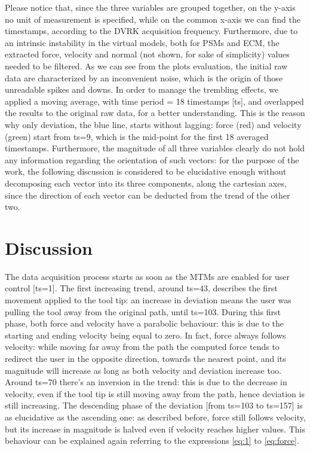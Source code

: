 \documentclass[conference]{IEEEtran}
\begin{document}
Please notice that, since the three variables are grouped together, on the y-axis no unit of measurement is specified, while on the common x-axis we can find the timestamps, according to the DVRK acquisition frequency. Furthermore, due to an intrinsic instability in the virtual models, both for PSMs and ECM, the extracted force, velocity and normal (not shown, for sake of simplicity) values needed to be filtered. As we can see from the plots evaluation, the initial raw data are characterized by an inconvenient noise, which is the origin of those unreadable spikes and downs. In order to manage the trembling effects, we applied a moving average, with time period = 18 timestamps [ts], and overlapped the results to the original raw data, for a better understanding. This is the reason why only deviation, the blue line, starts without lagging: force (red) and velocity (green) start from ts=9, which is the mid-point for the first 18 averaged timestamps. Furthermore, the magnitude of all three variables clearly do not hold any information regarding the orientation of such vectors: for the purpose of the work, the following discussion is considered to be elucidative enough without decomposing each vector into its three components, along the cartesian axes, since the direction of each vector can be deducted from the trend of the other two.

\section{Discussion}

The data acquisition process starts as soon as the MTMs are enabled for user control [ts=1]. The first increasing trend, around ts=43, describes the first movement applied to the tool tip: an increase in deviation means the user was pulling the tool away from the original path, until ts=103. During this first phase, both force and velocity have a parabolic behaviour: this is due to the starting and ending velocity being equal to zero. In fact, force always follows velocity: while moving far away from the path the computed force tends to redirect the user in the opposite direction, towards the nearest point, and its magnitude will increase as long as both velocity and deviation increase too. Around ts=70 there’s an inversion in the trend: this is due to the decrease in velocity, even if the tool tip is still moving away from the path, hence deviation is still increasing. The descending phase of the deviation [from ts=103 to ts=157] is as elucidative as the ascending one: as described before, force still follows velocity, but its increase in magnitude is halved even if velocity reaches higher values. This behaviour can be explained again referring to the expressions \ref{eq:1} to \ref{eq:force}. 
\end{document}
